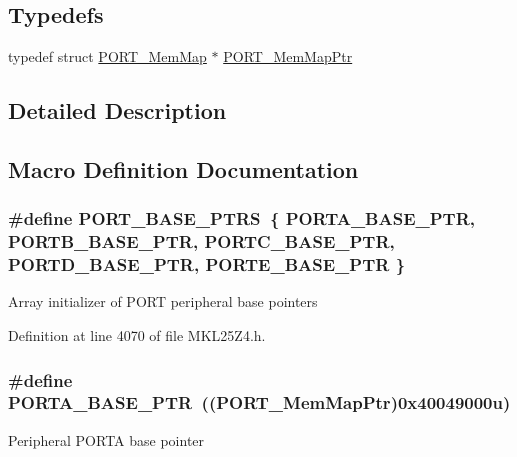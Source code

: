 \subsection*{Typedefs}
\begin{DoxyCompactItemize}
\item 
typedef struct \hyperlink{struct_p_o_r_t___mem_map}{P\+O\+R\+T\+\_\+\+Mem\+Map} $\ast$ \hyperlink{group___p_o_r_t___peripheral_ga0e26bafb7c17808f90278627bcbcaf8c}{P\+O\+R\+T\+\_\+\+Mem\+Map\+Ptr}
\end{DoxyCompactItemize}


\subsection{Detailed Description}


\subsection{Macro Definition Documentation}
\subsubsection[{\texorpdfstring{P\+O\+R\+T\+\_\+\+B\+A\+S\+E\+\_\+\+P\+T\+RS}{PORT_BASE_PTRS}}]{\setlength{\rightskip}{0pt plus 5cm}\#define P\+O\+R\+T\+\_\+\+B\+A\+S\+E\+\_\+\+P\+T\+RS~\{ {\bf P\+O\+R\+T\+A\+\_\+\+B\+A\+S\+E\+\_\+\+P\+TR}, {\bf P\+O\+R\+T\+B\+\_\+\+B\+A\+S\+E\+\_\+\+P\+TR}, {\bf P\+O\+R\+T\+C\+\_\+\+B\+A\+S\+E\+\_\+\+P\+TR}, {\bf P\+O\+R\+T\+D\+\_\+\+B\+A\+S\+E\+\_\+\+P\+TR}, {\bf P\+O\+R\+T\+E\+\_\+\+B\+A\+S\+E\+\_\+\+P\+TR} \}}\hypertarget{group___p_o_r_t___peripheral_ga54ff5179f8acaef2e1683cedfc0ef453}{}\label{group___p_o_r_t___peripheral_ga54ff5179f8acaef2e1683cedfc0ef453}
Array initializer of P\+O\+RT peripheral base pointers 

Definition at line 4070 of file M\+K\+L25\+Z4.\+h.

\subsubsection[{\texorpdfstring{P\+O\+R\+T\+A\+\_\+\+B\+A\+S\+E\+\_\+\+P\+TR}{PORTA_BASE_PTR}}]{\setlength{\rightskip}{0pt plus 5cm}\#define P\+O\+R\+T\+A\+\_\+\+B\+A\+S\+E\+\_\+\+P\+TR~(({\bf P\+O\+R\+T\+\_\+\+Mem\+Map\+Ptr})0x40049000u)}\hypertarget{group___p_o_r_t___peripheral_gaa18ec7594fe603225220ec6eda4a19ce}{}\label{group___p_o_r_t___peripheral_gaa18ec7594fe603225220ec6eda4a19ce}
Peripheral P\+O\+R\+TA base pointer 

